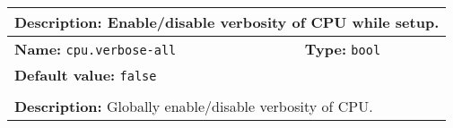 \begin{center}
\begin{tabular}{|p{7.5cm}|p{7.5cm}|}
	\multicolumn{2}{|p{15cm}|}{\textbf{Description:} \newline Enable/disable verbosity of CPU while setup.}\\
	\hline
	\multicolumn{1}{|p{7.5cm}}{\textbf{Name:} \texttt{cpu.verbose-all}} & \multicolumn{1}{p{7.5cm}|}{\textbf{Type:} \texttt{bool}}\\
	\multicolumn{2}{|p{15cm}|}{\textbf{Default value:} \texttt{false}}\\
	\multicolumn{2}{|l|}{}\\
	\multicolumn{2}{|p{15cm}|}{\textbf{Description:} \newline Globally enable/disable verbosity of CPU.}\\
	\hline
	\end{tabular}
\end{center}

